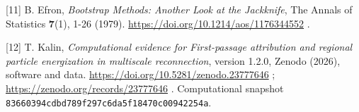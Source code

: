 \begin{samepage}
{[}11{]} B. Efron, \emph{Bootstrap Methods: Another Look at the
Jackknife}, The Annals of Statistics \textbf{7}(1), 1-26 (1979).
\url{https://doi.org/10.1214/aos/1176344552} .
\end{samepage}

\begin{samepage}
{[}12{]} T. Kalin, \emph{Computational evidence for First-passage
attribution and regional particle energization in multiscale
reconnection}, version 1.2.0, Zenodo (2026), software and data.
\url{https://doi.org/10.5281/zenodo.23777646} ;
\url{https://zenodo.org/records/23777646} . Computational snapshot
\nolinkurl{83660394cdbd789f297c6da5f18470c00942254a}.
\end{samepage}
\endgroup

